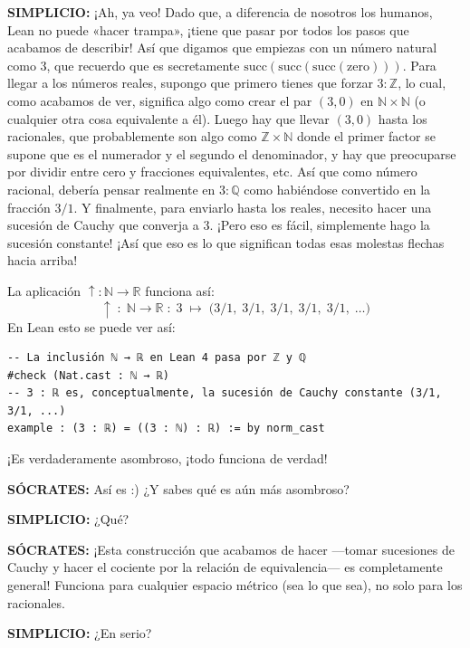 \medskip
\noindent\textbf{SIMPLICIO:} ¡Ah, ya veo! Dado que, a diferencia de nosotros los humanos, Lean no puede «hacer trampa», ¡tiene que pasar por todos los pasos que acabamos de describir! Así que digamos que empiezas con un número natural como $3$, que recuerdo que es secretamente $\text{succ}(\text{succ}(\text{succ}(\text{zero})))$. Para llegar a los números reales, supongo que primero tienes que forzar $3 : \mathbb{Z}$, lo cual, como acabamos de ver, significa algo como crear el par $(3, 0)$ en $\mathbb{N} \times \mathbb{N}$ (o cualquier otra cosa equivalente a él). Luego hay que llevar $(3, 0)$ hasta los racionales, que probablemente son algo como $\mathbb{Z} \times \mathbb{N}$ donde el primer factor se supone que es el numerador y el segundo el denominador, y hay que preocuparse por dividir entre cero y fracciones equivalentes, etc. Así que como número racional, debería pensar realmente en $3 : \mathbb{Q}$ como habiéndose convertido en la fracción $3/1$. Y finalmente, para enviarlo hasta los reales, necesito hacer una sucesión de Cauchy que converja a $3$. ¡Pero eso es fácil, simplemente hago la sucesión constante! ¡Así que eso es lo que significan todas esas molestas flechas hacia arriba!

La aplicación $\uparrow : \mathbb{N} \to \mathbb{R}$ funciona así:
\[
  \uparrow\;:\;\mathbb{N} \to \mathbb{R}
  \;:\;
  3 \;\mapsto\; \bigl(3/1,\;3/1,\;3/1,\;3/1,\;3/1,\;\ldots\bigr)
\]
En Lean esto se puede ver así:

\begin{verbatim}
-- La inclusión ℕ → ℝ en Lean 4 pasa por ℤ y ℚ
#check (Nat.cast : ℕ → ℝ)
-- 3 : ℝ es, conceptualmente, la sucesión de Cauchy constante (3/1, 3/1, ...)
example : (3 : ℝ) = ((3 : ℕ) : ℝ) := by norm_cast
\end{verbatim}

¡Es verdaderamente asombroso, ¡todo funciona de verdad!

\medskip
\noindent\textbf{SÓCRATES:} Así es :) ¿Y sabes qué es aún más asombroso?

\medskip
\noindent\textbf{SIMPLICIO:} ¿Qué?

\medskip
\noindent\textbf{SÓCRATES:} ¡Esta construcción que acabamos de hacer —tomar sucesiones de Cauchy y hacer el cociente por la relación de equivalencia— es completamente general! Funciona para cualquier espacio métrico (sea lo que sea), no solo para los racionales.

\medskip
\noindent\textbf{SIMPLICIO:} ¿En serio?


